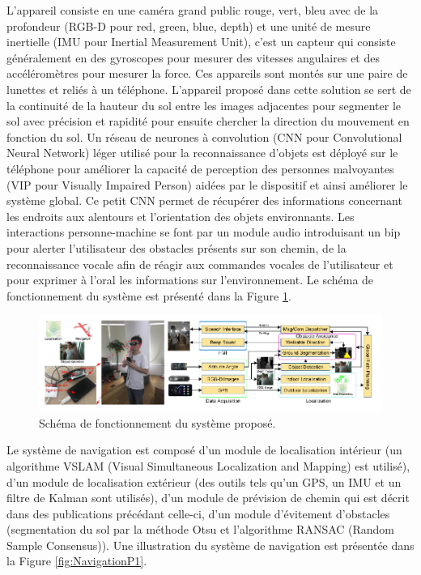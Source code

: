 \documentclass[11pt]{article}
\begin{document}
  L'appareil consiste en une caméra grand public rouge, vert, bleu avec de la profondeur (RGB-D pour red, green, blue, depth)
  et une unité de mesure inertielle (IMU pour Inertial Measurement Unit), c'est un capteur qui consiste généralement en des gyroscopes 
  pour mesurer des vitesses angulaires et des accéléromètres pour mesurer la force. Ces appareils sont montés sur une paire de lunettes
  et reliés à un téléphone. L'appareil proposé dans cette solution se sert de la continuité de la hauteur du sol entre les images adjacentes
  pour segmenter le sol avec précision et rapidité pour ensuite chercher la direction du mouvement en fonction du sol.
  Un réseau de neurones à convolution (CNN pour Convolutional Neural Network) léger utilisé pour la reconnaissance d'objets est 
  déployé sur le téléphone pour améliorer la capacité de perception des personnes malvoyantes (VIP pour Visually Impaired Person) aidées 
  par le dispositif et ainsi améliorer le système global. Ce petit CNN permet de récupérer des informations concernant les endroits 
  aux alentours et l'orientation des objets environnants. Les interactions personne-machine se font par un module audio introduisant un bip 
  pour alerter l'utilisateur des obstacles présents sur son chemin, de la reconnaissance vocale afin de réagir aux commandes vocales 
  de l'utilisateur et pour exprimer à l'oral les informations sur l'environnement. Le schéma de fonctionnement du système est présenté dans 
  la Figure \ref{fig:PipelineP1}.

  \begin{figure}[hbt]  
    \includegraphics[width=\textwidth]{PipelineP1.png}    
    \caption{Schéma de fonctionnement du système proposé.}
    \label{fig:PipelineP1}
  \end{figure} 

  Le système de navigation est composé d'un module de localisation intérieur (un algorithme VSLAM (Visual Simultaneous 
  Localization and Mapping) est utilisé), d'un module de localisation extérieur (des outils tels qu'un GPS, un IMU et un filtre de Kalman 
  sont utilisés), d'un module de prévision de chemin qui est décrit dans des publications précédant celle-ci, d'un module d'évitement 
  d'obstacles (segmentation du sol par la méthode Otsu et l'algorithme RANSAC (Random Sample Consensus)). Une illustration du système de
  navigation est présentée dans la Figure \ref{fig:NavigationP1}.
\end{document}
